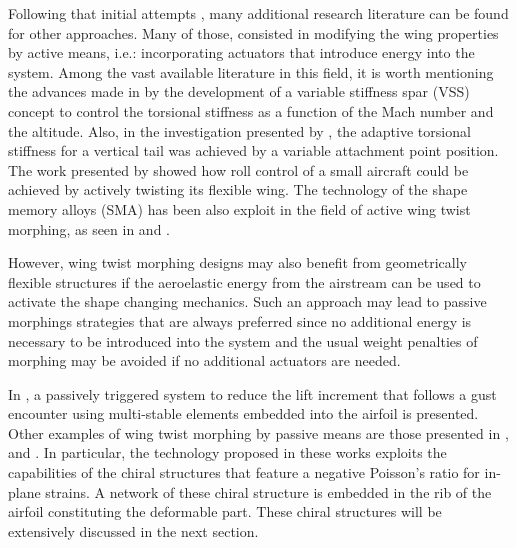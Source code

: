   Following that initial attempts , many additional research literature can be found for other approaches. Many of those, consisted in modifying the wing properties by active means, i.e.: incorporating actuators that introduce energy into the system. Among the vast available literature in this field, it is worth mentioning the advances made in \cite{Chen2000} by the development of a variable stiffness spar (VSS) concept to control the torsional stiffness as a function of the Mach number and the altitude. Also, in the investigation presented by \cite{Amprikidis2005}, the adaptive torsional stiffness for a vertical tail was achieved by a variable attachment point position. The work presented by \cite{Stanford2007} showed how roll control of a small aircraft could be achieved by actively twisting its flexible wing. The technology of the shape memory alloys (SMA) has been also exploit in the field of active wing twist morphing, as seen in \cite{Sanders2001} and \cite{Elzey2003}.

  However, wing twist morphing designs may also benefit from geometrically flexible structures if the aeroelastic energy from the airstream can be used to activate the shape changing mechanics. Such an approach may lead to passive morphings strategies that are always preferred since no additional energy is necessary to be introduced into the system and the usual weight penalties of morphing may be avoided if no additional actuators are needed. 

  In \cite{Arrieta2014}, a passively triggered system to reduce the lift increment that follows a gust encounter using multi-stable elements embedded into the airfoil is presented. Other examples of wing twist morphing by passive means are those presented in \cite{Bornengo2005}, \cite{Spadoni2007a} and \cite{Spadoni2007b}. In particular, the technology proposed in these works exploits the capabilities of the chiral structures that feature a negative Poisson's ratio for in-plane strains. A network of these chiral structure is embedded in the rib of the airfoil constituting the deformable part. These chiral structures will be extensively discussed in the next section.


